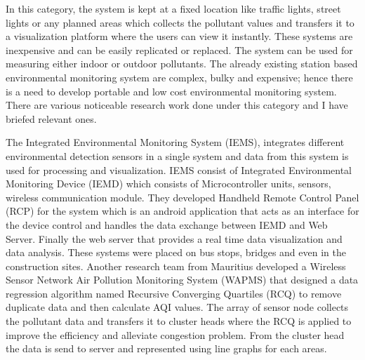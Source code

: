  In this category, the system is kept at a fixed location like traffic lights, street lights or any planned areas \cite{Pavani2017} which collects the pollutant values and transfers it to a visualization platform where the users can view it instantly. These systems are inexpensive and can be easily replicated or replaced. The system can be used for measuring either indoor or outdoor pollutants. The already existing station based environmental monitoring system are complex, bulky and expensive; hence there is a need to develop portable and low cost environmental monitoring system. There are various noticeable research work done under this category and I have briefed relevant ones.
 \par
  The Integrated Environmental Monitoring System (IEMS)\cite{Wong2014}, integrates different environmental detection sensors in a single system and data from this system is used for processing and visualization. IEMS consist of Integrated Environmental Monitoring Device (IEMD) which consists of Microcontroller units, sensors, wireless communication module. They developed Handheld Remote Control Panel (RCP) for the system which is an android application that acts as an interface for the device control and handles the data exchange between IEMD and Web Server. Finally the web server that provides a real time data visualization and data analysis. These systems were placed on bus stops, bridges and even in the construction sites. Another research team from Mauritius developed a Wireless Sensor Network Air Pollution Monitoring System (WAPMS) \cite{K.Khedo2010} that designed a data regression algorithm named Recursive Converging Quartiles (RCQ) to remove duplicate data and then calculate AQI values. The array of sensor node collects the pollutant data and transfers it to cluster heads where the RCQ is applied to improve the efficiency and alleviate congestion problem. From the cluster head the data is send to server and represented using line graphs for each areas.

